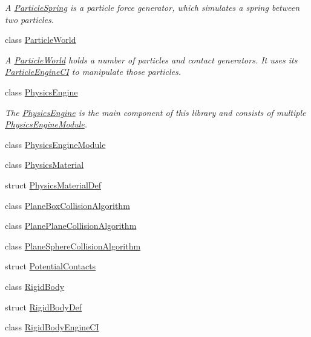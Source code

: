 \begin{DoxyCompactItemize}
\begin{DoxyCompactList}\small\item\em A \mbox{\hyperlink{classr3_1_1_particle_spring}{Particle\+Spring}} is a particle force generator, which simulates a spring between two particles. \end{DoxyCompactList}\item 
class \mbox{\hyperlink{classr3_1_1_particle_world}{Particle\+World}}
\begin{DoxyCompactList}\small\item\em A \mbox{\hyperlink{classr3_1_1_particle_world}{Particle\+World}} holds a number of particles and contact generators. It uses its \mbox{\hyperlink{classr3_1_1_particle_engine_c_i}{Particle\+Engine\+CI}} to manipulate those particles. \end{DoxyCompactList}\item 
class \mbox{\hyperlink{classr3_1_1_physics_engine}{Physics\+Engine}}
\begin{DoxyCompactList}\small\item\em The \mbox{\hyperlink{classr3_1_1_physics_engine}{Physics\+Engine}} is the main component of this library and consists of multiple \mbox{\hyperlink{classr3_1_1_physics_engine_module}{Physics\+Engine\+Module}}. \end{DoxyCompactList}\item 
class \mbox{\hyperlink{classr3_1_1_physics_engine_module}{Physics\+Engine\+Module}}
\item 
class \mbox{\hyperlink{classr3_1_1_physics_material}{Physics\+Material}}
\item 
struct \mbox{\hyperlink{structr3_1_1_physics_material_def}{Physics\+Material\+Def}}
\item 
class \mbox{\hyperlink{classr3_1_1_plane_box_collision_algorithm}{Plane\+Box\+Collision\+Algorithm}}
\item 
class \mbox{\hyperlink{classr3_1_1_plane_plane_collision_algorithm}{Plane\+Plane\+Collision\+Algorithm}}
\item 
class \mbox{\hyperlink{classr3_1_1_plane_sphere_collision_algorithm}{Plane\+Sphere\+Collision\+Algorithm}}
\item 
struct \mbox{\hyperlink{structr3_1_1_potential_contacts}{Potential\+Contacts}}
\item 
class \mbox{\hyperlink{classr3_1_1_rigid_body}{Rigid\+Body}}
\item 
struct \mbox{\hyperlink{structr3_1_1_rigid_body_def}{Rigid\+Body\+Def}}
\item 
class \mbox{\hyperlink{classr3_1_1_rigid_body_engine_c_i}{Rigid\+Body\+Engine\+CI}}

\end{DoxyCompactItemize}
